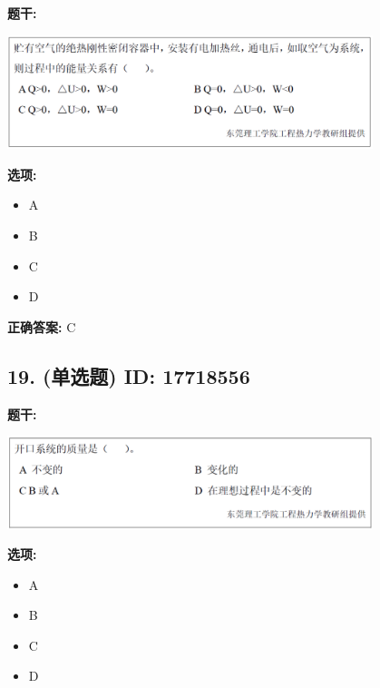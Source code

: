 \documentclass[12pt]{article}
\begin{document}
\textbf{题干:}


\begin{center}\includegraphics[width=0.8\textwidth, height=0.25\textheight, keepaspectratio]{question_18_17718554/title_img_1.png}\end{center}

\textbf{选项:}
\begin{itemize}[leftmargin=*]
  \item A

  \item B

  \item C

  \item D

\end{itemize}

\textbf{正确答案:}
C

\vspace{0.5em}\hrulefill\vspace{1em}

\subsection*{19. (单选题) \small ID: 17718556}

\textbf{题干:}


\begin{center}\includegraphics[width=0.8\textwidth, height=0.25\textheight, keepaspectratio]{question_19_17718556/title_img_1.png}\end{center}

\textbf{选项:}
\begin{itemize}[leftmargin=*]
  \item A

  \item B

  \item C

  \item D

\end{itemize}
\end{document}
